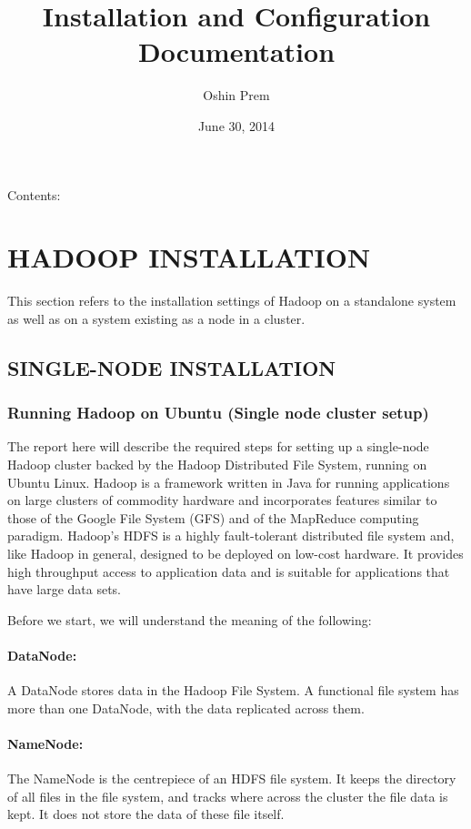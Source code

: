 \documentclass[letterpaper,10pt,english]{sphinxmanual}
\title{Installation and Configuration Documentation}
\date{June 30, 2014}
\author{Oshin Prem}
\begin{document}
\maketitle
\tableofcontents
{}\label{index::doc}


Contents:


\chapter{HADOOP INSTALLATION}
\label{hadoop:welcome-to-installation-and-configuration-s-documentation}\label{hadoop::doc}\label{hadoop:hadoop-installation}
This section refers to the installation settings of Hadoop on a standalone system
as well as on a system existing as a node in a cluster.


\section{SINGLE-NODE INSTALLATION}
\label{hadoop:single-node-installation}

\subsection{Running Hadoop on Ubuntu (Single node cluster setup)}
\label{hadoop:running-hadoop-on-ubuntu-single-node-cluster-setup}
The report here will describe the required steps for setting up a single-node Hadoop cluster backed by the Hadoop Distributed File System, running on Ubuntu Linux.
Hadoop is a framework written in Java for running applications on large clusters of commodity hardware and incorporates features similar to those of the Google File System (GFS) and of the MapReduce computing paradigm. Hadoop’s HDFS is a highly fault-tolerant distributed file system and, like Hadoop in general, designed to be deployed on low-cost hardware. It provides high throughput access to application data and is suitable for applications that have large data sets.

Before we start, we will understand the meaning of the following:


\subsubsection{DataNode:}
\label{hadoop:datanode}
A DataNode stores data in the Hadoop File System. A functional file system has more than one DataNode, with the data replicated across them.


\subsubsection{NameNode:}
\label{hadoop:namenode}
The NameNode is the centrepiece of an HDFS file system. It keeps the directory of all files in the file system, and tracks where across the cluster the file data is kept. It does not store the data of these file itself.
\end{document}
